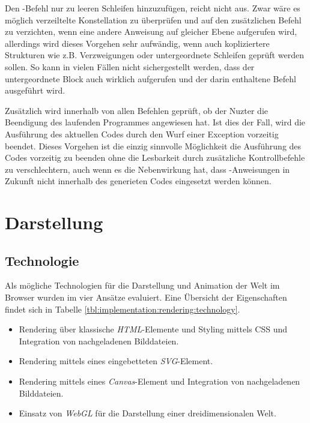 Den -Befehl nur zu leeren Schleifen hinzuzufügen, reicht nicht aus. Zwar wäre es möglich verzeiltelte Konstellation zu überprüfen und auf den zusätzlichen Befehl zu verzichten, wenn eine andere Anweisung auf gleicher Ebene aufgerufen wird, allerdings wird dieses Vorgehen sehr aufwändig, wenn auch kopliziertere Strukturen wie z.B. Verzweigungen oder untergeordnete Schleifen geprüft werden sollen. So kann in vielen Fällen nicht sichergestellt werden, dass der untergeordnete Block auch wirklich aufgerufen und der darin enthaltene Befehl ausgeführt wird.

Zusätzlich wird innerhalb von allen Befehlen geprüft, ob der Nuzter die Beendigung des laufenden Programmes angewiesen hat. Ist dies der Fall, wird die Ausführung des aktuellen Codes durch den Wurf einer Exception vorzeitig beendet. Dieses Vorgehen ist die einzig sinnvolle Möglichkeit die Ausführung des Codes vorzeitig zu beenden ohne die Lesbarkeit durch zusätzliche Kontrollbefehle zu verschlechtern, auch wenn es die Nebenwirkung hat, dass -Anweisungen in Zukunft nicht innerhalb des generieten Codes eingesetzt werden können.

\section{Darstellung}
\label{sec:implementation:rendering}

\TODO{}


\subsection{Technologie}
\label{sec:implementation:rendering:technology}

Als mögliche Technologien für die Darstellung und Animation der Welt im Browser wurden im vier Ansätze evaluiert. Eine Übersicht der Eigenschaften findet sich in Tabelle \ref{tbl:implementation:rendering:technology}.

\begin{itemize}[noitemsep]
  \item Rendering über klassische \emph{HTML}-Elemente und Styling mittels CSS und Integration von nachgeladenen Bilddateien.
  \item Rendering mittels eines eingebetteten \emph{SVG}-Element.
  \item Rendering mittels eines \emph{Canvas}-Element und Integration von nachgeladenen Bilddateien.
  \item Einsatz von \emph{WebGL} für die Darstellung einer dreidimensionalen Welt.
\end{itemize}

